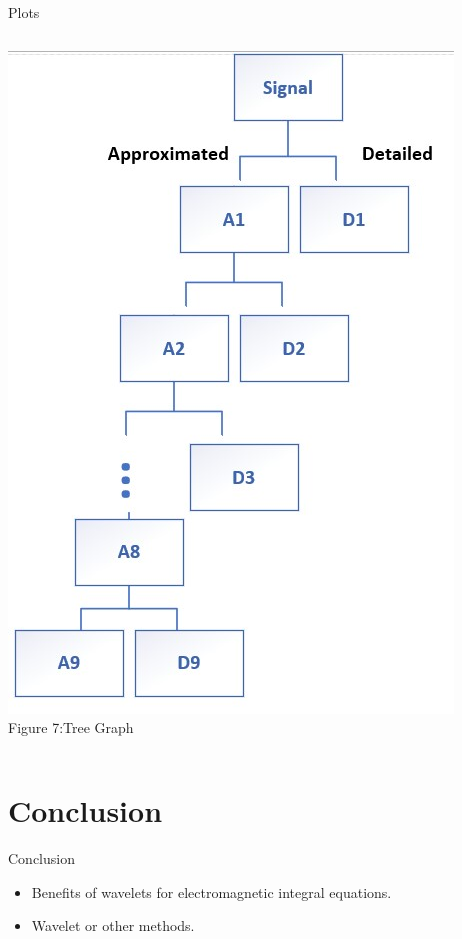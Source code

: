 \documentclass{beamer}
\begin{document}
\begin{frame}{Plots}
\begin{columns}[T]
        \includegraphics[width=\textwidth, height=0.6\textheight]{Tree graph.jpg} \\[0.2cm] %
        {\scriptsize {Figure 7:}Tree Graph} %
        
    \end{columns}

\end{frame}

\section{Conclusion}
\begin{frame}{Conclusion}
    \begin{itemize}
        \vspace*{-\baselineskip}
        \item Benefits of wavelets for electromagnetic integral equations.
        \item Wavelet or other methods.
    \end{itemize}
\end{frame}
\end{document}

